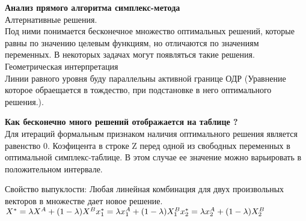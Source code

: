 \Large{ \textbf {Анализ прямого алгоритма симплекс-метода }}\\
Алтернативные решения.\\
Под ними понимается бесконечное множество оптимальных решений, которые равны по значению целевым функциям,
 но отличаются по значениям переменных. В некоторых задачах могут появляться такие решения.\\
Геометрическая интерпретация\\
Линии равного уровня буду параллельны активной границе ОДР
(Уравнение которое обраещается в тождество, при подстановке в него оптимального решения.).

\Large{ \textbf { Как бесконечно много решений отображается на таблице ?}}\\
Для итераций формальным признаком наличия оптимального решения является равенство 0.
Коэфицента в строке Z перед одной из свободных переменных в оптимальной симплекс-таблице.
В этом случае ее значение можно варьировать в положительном интервале.

Свойство выпуклости:
Любая линейная комбинация для двух произвольных векторов в множестве дает новое решение. \\
$
X^* = \lambda X^A + (1 - \lambda)X^B \\
x_1 ^ * = \lambda x_1 ^A + (1 - \lambda)X^B_1 \\
x_2 ^ * = \lambda x_2 ^A + (1 - \lambda)X^B_2 \\
$
